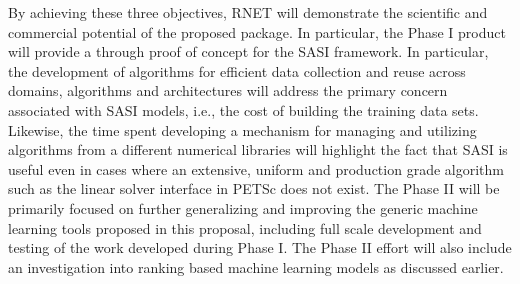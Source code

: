 By achieving these three objectives, RNET will demonstrate the scientific and commercial potential of the proposed package. In particular, the Phase I product will provide a through proof of concept for the SASI framework. In particular, the development of algorithms for efficient data collection and reuse across domains, algorithms and architectures will address the primary concern associated with SASI models, i.e., the cost of building the training data sets. Likewise, the time spent developing a mechanism for managing and utilizing algorithms from a different numerical libraries will highlight the fact that SASI is useful even in cases where an extensive, uniform and production grade algorithm such as the linear solver interface in PETSc does not exist. 
The Phase II will be primarily focused on further generalizing and improving the generic machine learning tools proposed in this proposal, including full scale development and testing of the work developed during Phase I. The Phase II effort will also include an investigation into ranking based machine learning models as discussed earlier. 

